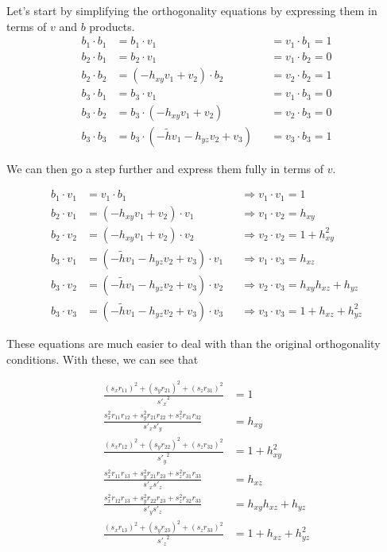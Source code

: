 \documentclass{article}
\begin{document}
Let's start by simplifying the orthogonality equations by expressing them in terms of $v$ and $b$ products.
\begin{align}
b_1 \cdot b_1 &= b_1 \cdot v_1 &&= v_1 \cdot b_1 = 1\\
b_2 \cdot b_1 &= b_2 \cdot v_1 &&= v_1 \cdot b_2 = 0\\
b_2 \cdot b_2 &= (-h_{xy} v_1 + v_2) \cdot b_2 &&= v_2 \cdot b_2 =1\\
b_3 \cdot b_1 &= b_3 \cdot v_1 &&= v_1 \cdot b_3 = 0\\
b_3 \cdot b_2 &= b_3 \cdot (-h_{xy} v_1 + v_2) &&= v_2 \cdot b_3 = 0\\
b_3 \cdot b_3 &= b_3 \cdot (-\widetilde{h} v_1 - h_{yz} v_2 + v_3) &&= v_3 \cdot b_3 = 1
\end{align}

We can then go a step further and express them fully in terms of $v$.

\begin{align}
b_1 \cdot v_1 &= v_1 \cdot b_1 &&\Rightarrow v_1 \cdot v_1 = 1\\
b_2 \cdot v_1 &= (-h_{xy} v_1 + v_2) \cdot v_1  &&\Rightarrow v_1 \cdot v_2 = h_{xy}\\
b_2 \cdot v_2 &= (-h_{xy} v_1 + v_2) \cdot v_2 &&\Rightarrow  v_2 \cdot v_2 =1 + h_{xy}^2\\
b_3 \cdot v_1 &= (-\widetilde{h} v_1 - h_{yz} v_2 + v_3) \cdot v_1 &&\Rightarrow v_1 \cdot v_3 = h_{xz} \\
b_3 \cdot v_2 &= (-\widetilde{h} v_1 - h_{yz} v_2 + v_3) \cdot v_2 &&\Rightarrow v_2 \cdot v_3 = h_{xy} h_{xz} + h_{yz}\\
b_3 \cdot v_3 &= (-\widetilde{h} v_1 - h_{yz} v_2 + v_3) \cdot v_3 &&\Rightarrow v_3 \cdot v_3 = 1 + h_{xz} + h_{yz}^2
\end{align}

These equations are much easier to deal with than the original orthogonality conditions. With these, we can see that

\begin{align}
\frac{(s_x r_{11})^2 + (s_y r_{21})^2 + (s_z r_{31})^2}{{s'_x}^2} &= 1\\
\frac{s_x^2 r_{11}r_{12} + s_y^2 r_{21}r_{22} + s_z^2 r_{31}r_{32}}{s'_x s'_y} &= h_{xy}\\
\frac{(s_x r_{12})^2 + (s_y r_{22})^2 + (s_z r_{32})^2}{{s'_y}^2} &= 1 + h_{xy}^2\\
\frac{s_x^2 r_{11}r_{13} + s_y^2 r_{21}r_{23} + s_z^2 r_{31}r_{33}}{s'_x s'_z} &= h_{xz}\\
\frac{s_x^2 r_{12}r_{13} + s_y^2 r_{22}r_{23} + s_z^2 r_{32}r_{33}}{s'_y s'_z} &= h_{xy}h_{xz} + h_{yz}\\
\frac{(s_x r_{13})^2 + (s_y r_{23})^2 + (s_z r_{33})^2}{{s'_z}^2} &= 1 + h_{xz} + h^2_{yz}
\end{align}
\end{document}
